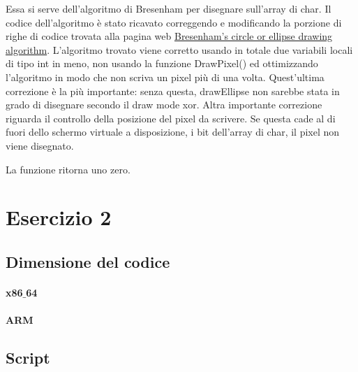 \documentclass[a4paper]{article}
\begin{document}
		Essa si serve dell'algoritmo di Bresenham per disegnare sull'array di char.
                Il codice dell'algoritmo è stato ricavato correggendo e modificando la porzione di righe di codice trovata alla pagina web
                \href{https://sites.google.com/site/ruslancray/lab/projects/bresenhamscircleellipsedrawingalgorithm/bresenham-s-circle-ellipse-drawing-algorithm}{Bresenham's circle or ellipse drawing algorithm}.
                L'algoritmo trovato viene corretto usando in totale due variabili locali di tipo int in meno, non usando la funzione DrawPixel()
                ed ottimizzando l'algoritmo in modo che non scriva un pixel più di una volta. Quest'ultima correzione è la più importante:
                senza questa, drawEllipse non sarebbe stata in grado di disegnare secondo il draw mode xor.
                Altra importante correzione riguarda il controllo della posizione del pixel da scrivere.
                Se questa cade al di fuori dello schermo virtuale a disposizione, i bit dell'array di char, il pixel non viene disegnato.
		
		La funzione ritorna uno zero.

\section{Esercizio 2}
	\subsection{Dimensione del codice}
		\paragraph{x86$\_$64}
		\paragraph{ARM}
	\subsection{Script}
\end{document}
